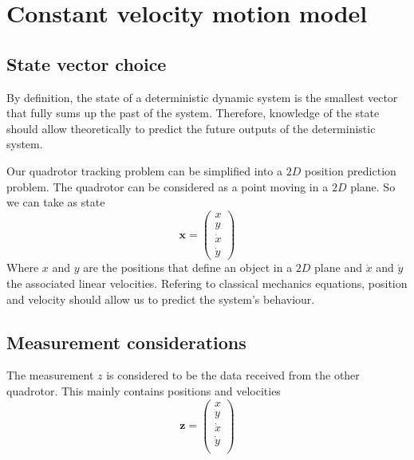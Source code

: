 \documentclass[12pt]{article}
\begin{document}
\section{Constant velocity motion model}

\subsection{State vector choice}
By definition, the state of a deterministic dynamic system is the smallest vector that fully sums up the past of the system.
Therefore, knowledge of the state should allow theoretically to predict the future outputs of the deterministic system.

Our quadrotor tracking problem can be simplified into a $2D$ position prediction problem.
The quadrotor can be considered as a point moving in a $2D$ plane.
So we can take as state
\begin{equation}
\mathbf{x} =
    \begin{pmatrix}
        x\\
        y\\
        \dot{x}\\
        \dot{y}
    \end{pmatrix}
\end{equation}
Where $x$ and $y$ are the positions that define an object in a $2D$ plane and $\dot{x}$ and $\dot{y}$ the associated linear velocities.
Refering to classical mechanics equations, position and velocity should allow us to predict the system's behaviour.

\subsection{Measurement considerations}
The measurement $z$ is considered to be the data received from the other quadrotor. This mainly contains positions and velocities
\begin{equation}
\mathbf{z} =
    \begin{pmatrix}
        x\\
        y\\
        \dot{x}\\
        \dot{y}\\
    \end{pmatrix}
\label{measurement_cvmm}
\end{equation}
\end{document}
